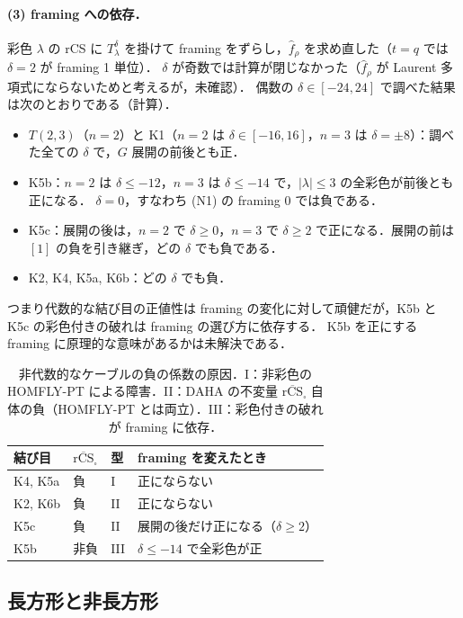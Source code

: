 \documentclass[11pt,a4paper]{ltjsarticle}
\theoremstyle{definition}
\theoremstyle{remark}
\newcommand{\rCS}{\overline{\mathrm{rCS}}}
\newcommand{\hf}{\widehat{f}}
\begin{document}
\paragraph{(3) framing への依存．}
彩色 $\lambda$ の rCS に $T_\lambda^\delta$ を掛けて framing をずらし，$\hf_\rho$ を求め直した（$t=q$ では $\delta=2$ が framing 1 単位）．
$\delta$ が奇数では計算が閉じなかった（$\hf_\rho$ が Laurent 多項式にならないためと考えるが，未確認）．
偶数の $\delta\in[-24,24]$ で調べた結果は次のとおりである（計算）．
\begin{itemize}
\item $T(2,3)$（$n=2$）と K1（$n=2$ は $\delta\in[-16,16]$，$n=3$ は $\delta=\pm8$）：調べた全ての $\delta$ で，$G$ 展開の前後とも正．
\item K5b：$n=2$ は $\delta\le-12$，$n=3$ は $\delta\le-14$ で，$|\lambda|\le3$ の全彩色が前後とも正になる．
  $\delta=0$，すなわち (N1) の framing 0 では負である．
\item K5c：展開の後は，$n=2$ で $\delta\ge0$，$n=3$ で $\delta\ge2$ で正になる．展開の前は $[1]$ の負を引き継ぎ，どの $\delta$ でも負である．
\item K2, K4, K5a, K6b：どの $\delta$ でも負．
\end{itemize}
つまり代数的な結び目の正値性は framing の変化に対して頑健だが，K5b と K5c の彩色付きの破れは framing の選び方に依存する．
K5b を正にする framing に原理的な意味があるかは未解決である．

\begin{table}[h]
\centering
\caption{非代数的なケーブルの負の係数の原因．I：非彩色の HOMFLY-PT による障害．II：DAHA の不変量 $\rCS_\square$ 自体の負（HOMFLY-PT とは両立）．III：彩色付きの破れが framing に依存．}\label{tab:cause}
\begin{tabular}{llll}
\toprule
結び目 & $\rCS_\square$ & 型 & framing を変えたとき \\
\midrule
K4, K5a & 負 & I & 正にならない \\
K2, K6b & 負 & II & 正にならない \\
K5c & 負 & II & 展開の後だけ正になる（$\delta\ge2$） \\
K5b & 非負 & III & $\delta\le-14$ で全彩色が正 \\
\bottomrule
\end{tabular}
\end{table}

\subsection{長方形と非長方形}
\end{document}
